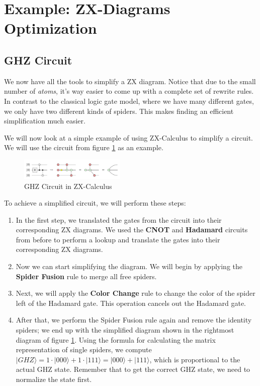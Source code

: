 \section{Example: ZX-Diagrams Optimization}

\subsection{GHZ Circuit}

We now have all the tools to simplify a ZX diagram. Notice that due to the small number of \textit{atoms}, it's way easier to come up with a complete set of rewrite rules. In contrast to the classical logic gate model, where we have many different gates, we only have two different kinds of spiders. This makes finding an efficient simplification much easier.

We will now look at a simple example of using ZX-Calculus to simplify a circuit. We will use the circuit from figure \ref{fig:ghz} as an example.

\begin{figure}
    \centering
    \includegraphics[width=0.45\textwidth]{images/ghz.png}
    \caption{GHZ Circuit in ZX-Calculus}
    \label{fig:ghz}
\end{figure}

To achieve a simplified circuit, we will perform these steps:

\begin{enumerate}
    \item
          In the first step, we translated the gates from the circuit into their corresponding ZX diagrams. We used the \textbf{CNOT} and \textbf{Hadamard} circuits from before to perform a lookup and translate the gates into their corresponding ZX diagrams.
    \item
          Now we can start simplifying the diagram. We will begin by applying the \textbf{Spider Fusion} rule to merge all free spiders.
    \item
          Next, we will apply the \textbf{Color Change} rule to change the color of the spider left of the Hadamard gate. This operation cancels out the Hadamard gate.
    \item
          After that, we perform the Spider Fusion rule again and remove the identity spiders; we end up with the simplified diagram shown in the rightmost diagram of figure \ref{fig:ghz}. Using the formula for calculating the matrix representation of single spiders, we compute $|GHZ\rangle = 1\cdot |000\rangle + 1\cdot |111\rangle = |000\rangle + |111\rangle$, which is proportional to the actual GHZ state. Remember that to get the correct GHZ state, we need to normalize the state first.
\end{enumerate}

